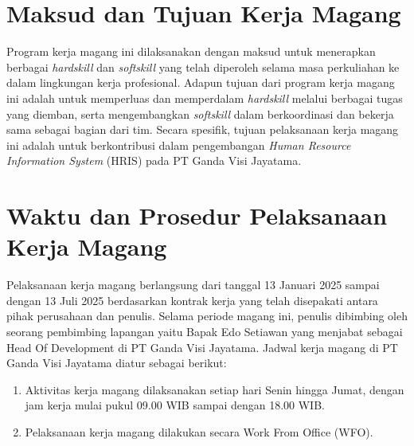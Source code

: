 

\section{Maksud dan Tujuan Kerja Magang}
Program kerja magang ini dilaksanakan dengan maksud untuk menerapkan berbagai 
\textit{hardskill} dan \textit{softskill} yang telah diperoleh selama masa 
perkuliahan ke dalam lingkungan kerja profesional. Adapun tujuan dari program 
kerja magang ini adalah untuk memperluas dan memperdalam \textit{hardskill} 
melalui berbagai tugas yang diemban, serta mengembangkan \textit{softskill} 
dalam berkoordinasi dan bekerja sama sebagai bagian dari tim. Secara spesifik, 
tujuan pelaksanaan kerja magang ini adalah untuk berkontribusi dalam 
pengembangan \textit{Human Resource Information System} (HRIS) pada 
PT Ganda Visi Jayatama.



\section{Waktu dan Prosedur Pelaksanaan Kerja Magang}

Pelaksanaan kerja magang berlangsung dari tanggal 13 Januari 2025 sampai dengan 
13 Juli 2025 berdasarkan kontrak kerja yang telah disepakati antara pihak 
perusahaan dan penulis. Selama periode magang ini, penulis dibimbing oleh 
seorang pembimbing lapangan yaitu Bapak Edo Setiawan yang 
menjabat sebagai Head Of Development di PT Ganda Visi Jayatama. Jadwal 
kerja magang di PT Ganda Visi Jayatama diatur sebagai berikut:

\begin{enumerate}
    \item Aktivitas kerja magang dilaksanakan setiap hari Senin hingga Jumat, 
    dengan jam kerja mulai pukul 09.00 WIB sampai dengan 18.00 WIB.
    \item Pelaksanaan kerja magang dilakukan secara Work From Office (WFO).
\end{enumerate}

